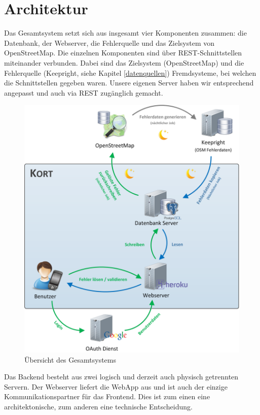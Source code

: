 \chapter{Architektur}
\label{architektur}

Das Gesamtsystem setzt sich aus insgesamt vier Komponenten zusammen: die Datenbank, der Webserver, die Fehlerquelle und das Zielsystem von OpenStreetMap. 
Die einzelnen Komponenten sind über \gls{REST}-Schnittstellen miteinander verbunden. 
Dabei sind das Zielsystem (OpenStreetMap) und die Fehlerquelle (Keepright, siehe Kapitel \ref{datenquellen}) Fremdsysteme, bei welchen die Schnittstellen gegeben waren. 
Unsere eigenen Server haben wir entsprechend angepasst und auch via REST zugänglich gemacht.

\begin{figure}[H]
	\centering
	\includegraphics[scale=0.32]{images/implementation/backend/kort-big_picture}
	\caption{Übersicht des Gesamtsystems}
	\label{image-kort-big-picture}
\end{figure}

Das Backend besteht aus zwei logisch und derzeit auch physisch getrennten Servern. 
Der Webserver liefert die \gls{WebApp} aus und ist auch der einzige Kommunikationspartner für das Frontend. Dies ist zum einen eine architektonische, zum anderen eine technische Entscheidung.

